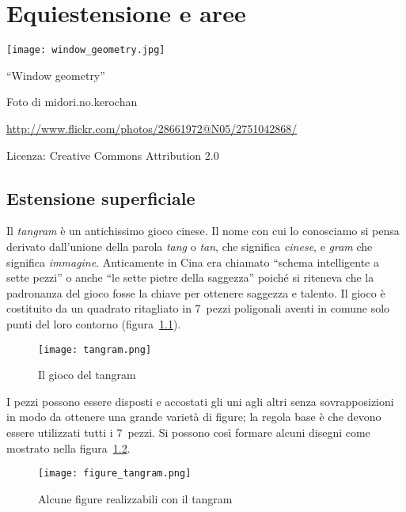 
\chapter{Equiestensione e aree}\label{chap:equiestensione_aree}

\texttt{[image: window\_geometry.jpg]}
  \begin{center}
    {\large ``Window geometry''}\par
    Foto di midori.no.kerochan\par
    \url{http://www.flickr.com/photos/28661972@N05/2751042868/}\par
    Licenza: Creative Commons Attribution 2.0\par
  \end{center}
\newpage


\section{Estensione superficiale}\label{sect:estensione_superficiale}

Il \emph{tangram}\label{tangram} è un antichissimo gioco cinese. Il nome con cui lo conosciamo si pensa derivato dall'unione della parola \emph{tang} o \emph{tan}, che significa \emph{cinese}, e \emph{gram} che significa \emph{immagine}. Anticamente in Cina era chiamato ``schema intelligente a sette pezzi'' o anche ``le sette pietre della saggezza'' poiché si riteneva che la padronanza del gioco fosse la chiave per ottenere saggezza e talento.
Il gioco è costituito da un quadrato ritagliato in 7~pezzi poligonali aventi in comune solo punti del loro contorno (figura~\ref{fig:tangram}).

\begin{figure}[!htb]
	\centering\texttt{[image: tangram.png]}
	\caption{Il gioco del tangram}\label{fig:tangram}
\end{figure}

I pezzi possono essere disposti e accostati gli uni agli altri senza sovrapposizioni in modo da ottenere una grande varietà di figure; la regola base è che devono essere utilizzati tutti i 7~pezzi. Si possono così formare alcuni disegni come mostrato nella figura~\ref{fig:figure_tangram}.

\begin{figure}[!htb]
	\centering\texttt{[image: figure\_tangram.png]}
	\caption{Alcune figure realizzabili con il tangram}\label{fig:figure_tangram}
\end{figure}

